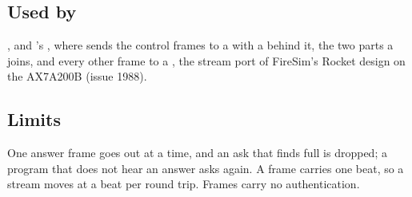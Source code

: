 \subsection*{Used by}

, and 's ,
where  sends the control frames to a 
with a  behind it, the two parts a 
joins, and every other frame to a , the stream port of
FireSim's Rocket design on the AX7A200B (issue 1988).

\subsection*{Limits}

One answer frame goes out at a time, and an ask that finds 
full is dropped; a program that does not hear an answer asks again.
A frame carries one beat, so a stream moves at a beat per round trip.
Frames carry no authentication.
